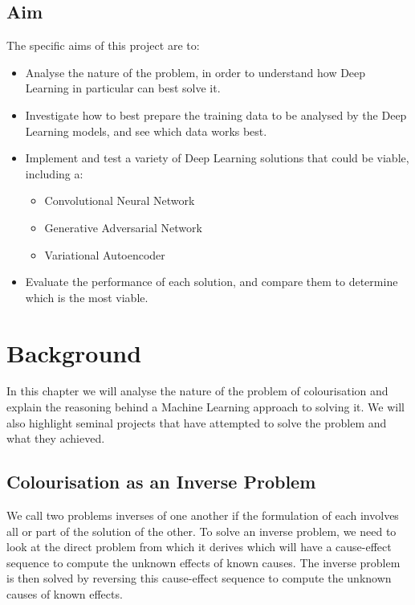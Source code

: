 \documentclass{l4proj}
\begin{document}
\section{Aim}

The specific aims of this project are to:
\begin{itemize}
    \item Analyse the nature of the problem, in order to understand how Deep Learning in particular can best solve it.
    \item Investigate how to best prepare the training data to be analysed by the Deep Learning models, and see which data works best.
    \item Implement and test a variety of Deep Learning solutions that could be viable, including a:
    \begin{itemize}
      \item Convolutional Neural Network
      \item Generative Adversarial Network
      \item Variational Autoencoder
    \end{itemize}
    \item Evaluate the performance of each solution, and compare them to determine which is the most viable.
\end{itemize}

\chapter{Background}

In this chapter we will analyse the nature of the problem of colourisation and explain the reasoning behind a Machine Learning approach to solving it. We will also highlight seminal projects that have attempted to solve the problem and what they achieved.

\section{Colourisation as an Inverse Problem}
\label{inverse-prob}
We call two problems inverses of one another if the formulation of each involves all or part of the solution of the other. To solve an inverse problem, we need to look at the direct problem from which it derives which will have a cause-effect sequence to compute the unknown effects of known causes. The inverse problem is then solved by reversing this cause-effect sequence to compute the unknown causes of known effects\cite{Inverses}.
\end{document}
